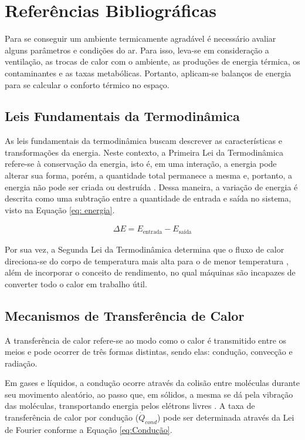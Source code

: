 \documentclass[acronym,symbols,table]{fei}
\begin{document}
\chapter{Referências Bibliográficas}

Para se conseguir um ambiente termicamente agradável é necessário avaliar alguns parâmetros e condições do ar. Para isso, leva-se em consideração a ventilação, as trocas de calor com o ambiente, as produções de energia térmica, os contaminantes e as taxas metabólicas. Portanto, aplicam-se balanços de energia para se calcular o conforto térmico no espaço.

\section{Leis Fundamentais da Termodinâmica} 

As leis fundamentais da termodinâmica buscam descrever as características e transformações da energia. Neste contexto, a Primeira Lei da Termodinâmica refere-se à conservação da energia, isto é, em uma interação, a energia pode alterar sua forma, porém, a quantidade total permanece a mesma e, portanto, a energia não pode ser criada ou destruída \cite{cengel1998heat}. Dessa maneira, a variação de energia é descrita como uma subtração entre a quantidade de entrada e saída no sistema, visto na Equação \ref{eq: energia}.

\begin{equation} \label{eq: energia}
    \begin{aligned}
    \Delta E = E_{\text{entrada}} - E_{\text{saída}}
    \end{aligned}
\end{equation}


Por sua vez, a Segunda Lei da Termodinâmica determina que o fluxo de calor direciona-se do corpo de temperatura mais alta para o de menor temperatura \cite{cengel1998heat}, além de incorporar o conceito de rendimento, no qual máquinas são incapazes de converter todo o calor em trabalho útil.

\section{Mecanismos de Transferência de Calor} 

A transferência de calor refere-se ao modo como o calor é transmitido entre os meios e pode ocorrer de três formas distintas, sendo elas: condução, convecção e radiação.

Em gases e líquidos, a condução ocorre através da colisão entre moléculas durante seu movimento aleatório, ao passo que, em sólidos, a mesma se dá pela vibração das moléculas, transportando energia pelos elétrons livres \cite{cengel1998heat}. A taxa de transferência de calor por condução ($\dot{Q}_{cond}$) pode ser determinada através da Lei de Fourier conforme a Equação \ref{eq:Condução}.
\end{document}
